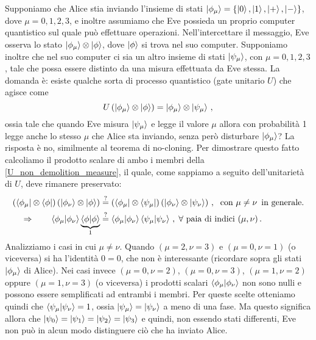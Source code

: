 \noindent Supponiamo che Alice stia inviando l'insieme di stati $\ket{\phi_\mu} = \{ \ket{0}, \ket{1}, \ket{+}, \ket{-} \}$, dove $\mu = 0, 1,2,3$, e inoltre assumiamo che Eve possieda un proprio computer quantistico sul quale può effettuare operazioni. Nell'intercettare il messaggio, Eve osserva lo stato $\ket{\phi_\mu} \otimes \ket{\phi}$, dove $\ket{\phi}$ si trova nel suo computer. Supponiamo inoltre che nel suo computer ci sia un altro insieme di stati $\ket{\psi_\mu}$, con $\mu = 0,1,2,3$, tale che possa essere distinto da una misura effettuata da Eve stessa. La domanda è: esiste qualche sorta di processo quantistico (gate unitario $U$) che agisce come
\begin{equation}\label{U_non_demolition_measure}
    U \left( \ket{\phi_\mu} \otimes \ket{\phi} \right) = \ket{\phi_\mu} \otimes \ket{\psi_\mu} \, ,
\end{equation}
ossia tale che quando Eve misura $\ket{\psi_\mu}$ e legge il valore $\mu$ allora con probabilità 1 legge anche lo stesso $\mu$ che Alice sta inviando, senza però disturbare $\ket{\phi_\mu}$? La risposta è no, similmente al teorema di no-cloning. Per dimostrare questo fatto calcoliamo il prodotto scalare di ambo i membri della \eqref{U_non_demolition_measure}, il quale, come sappiamo a seguito dell'unitarietà di $U$, deve rimanere preservato:
\begin{align*}
    \left( \bra{\phi_\mu} \otimes \bra{\phi} \right) \left( \ket{\phi_\nu} \otimes \ket{\phi} \right) &\overset{?}{=} \left( \bra{\phi_\mu} \otimes \bra{\psi_\mu} \right) \left( \ket{\phi_\nu} \otimes \ket{\psi_\nu} \right) \, , \; \text{ con } \mu \neq \nu \, \text{ in generale.} \\
    \Rightarrow \qquad \braket{\phi_\mu}{\phi_\nu} \underbrace{\braket{\phi}}_1 &\overset{?}{=} \braket{\phi_\mu}{\phi_\nu} \braket{\psi_\mu}{\psi_\nu} \, , \; \forall \text{ paia di indici } (\mu,\nu) \, .
\end{align*}
Analizziamo i casi in cui $\mu \neq \nu$. Quando $(\mu = 2, \nu = 3)$ e $(\mu = 0, \nu = 1)$ (o viceversa) si ha l'identità $0 = 0$, che non è interessante (ricordare sopra gli stati $\ket{\phi_\mu}$ di Alice). Nei casi invece $(\mu = 0, \nu = 2)$, $(\mu = 0, \nu = 3)$, $(\mu = 1, \nu = 2)$ oppure $(\mu = 1, \nu = 3)$ (o viceversa) i prodotti scalari $\braket{\phi_\mu}{\phi_\nu}$ non sono nulli e possono essere semplificati ad entrambi i membri. Per queste scelte otteniamo quindi che $\braket{\psi_\mu}{\psi_\nu} = 1$, ossia $\ket{\psi_\mu} = \ket{\psi_\nu}$ a meno di una fase. Ma questo significa allora che $\ket{\psi_0} = \ket{\psi_1} = \ket{\psi_2} = \ket{\psi_3}$ e quindi, non essendo stati differenti, Eve non può in alcun modo distinguere ciò che ha inviato Alice. 

